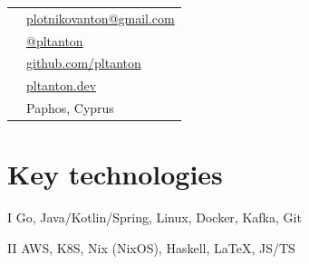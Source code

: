 \documentclass{cv}
\begin{document}

\noindent
\begin{minipage}{\dimexpr \wd0}
\end{minipage}
\begin{minipage}{\dimexpr \textwidth-\wd0-\columnsep}

	\begin{center}
		\begin{tabular}{cl}
			\faEnvelope      & \href{mailto:plotnikovanton@gmail.com}{plotnikovanton@gmail.com} \\
			\faTelegramPlane & \href{https://t.me/pltanton}{@pltanton}                          \\
			\faGithub*       & \href{https://github.com/pltanton}{github.com/pltanton}          \\
			\faGlobe         & \href{https://pltanton.dev}{pltanton.dev}                        \\
			\faMapPin        & Paphos, Cyprus
		\end{tabular}
	\end{center}
\end{minipage}

\vspace{2em}


\section{Key technologies}

\begin{cvblock}{I}
	Go, Java/Kotlin/Spring, Linux, Docker, Kafka, Git
\end{cvblock}

\begin{cvblock}{II}
	AWS, K8S, Nix (NixOS), Haskell, \LaTeX, JS/TS
\end{cvblock}
\end{document}

